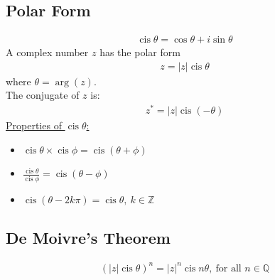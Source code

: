 \documentclass[10pt, a4paper, titlepage]{article}
\DeclareMathOperator\cis{cis}
\newcommand{\mbb}[1]{\mathbb{#1}}
\begin{document}
\begin{multicols*}{3}
	\subsection{Polar Form}
	\begin{align}
		\cis{\theta}=\cos{\theta}+i\sin{\theta}
	\end{align}
	A complex number $z$ has the polar form
	\begin{align}
		z=|z|\cis{\theta}
	\end{align}
	where $\theta = \arg({z})$.\\
	The conjugate of $z$ is:
	\begin{align}
		z^*=|z|\cis{(-\theta)}
	\end{align}
	\underline{Properties of $\cis{\theta}$:}
	\begin{itemize}
		\item $\cis{\theta}\times \cis{\phi}=\cis{(\theta +\phi )}$
		\item $\frac{\cis{\theta}}{\cis{\phi}}=\cis{(\theta -\phi )}$
		\item $\cis{(\theta -2k\pi )}=\cis{\theta},\ k\in \mbb{Z}$
	\end{itemize}


	\dotfill
	\subsection{De Moivre's Theorem}
	\begin{align}
		(|z|\cis{\theta})^n=|z|^n\cis{n\theta},\ \text{for all }n\in \mbb{Q}
	\end{align}
	\dotfill

\end{multicols*}
\end{document}
